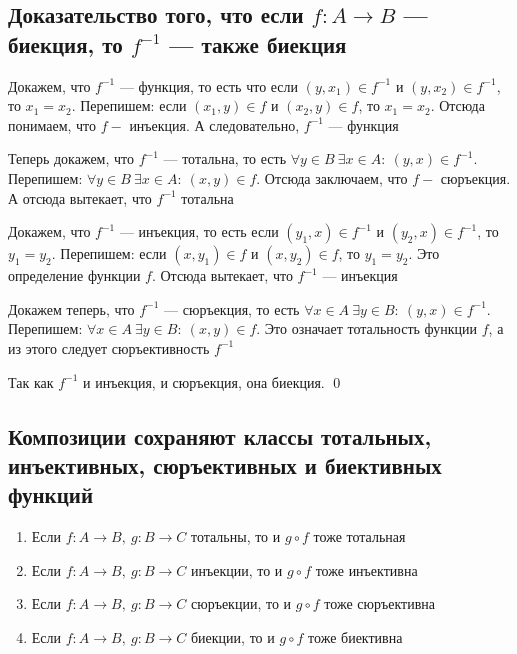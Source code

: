 \documentclass[a4paper]{article}
\begin{document}
\subsection{Доказательство того, что если $f: A\rightarrow B$ — биекция, то $f^{-1}$ — также биекция}
\label{sec:2.6}Докажем, что $f^{-1}$ — функция, то есть что если $(y, x_1)\in f^{-1}$ и $(y, x_2)\in f^{-1}$, то $x_1=x_2$. Перепишем: если $(x_1, y)\in f$ и $(x_2, y)\in f$, то $x_1=x_2$. Отсюда понимаем, что $f-$ инъекция. А следовательно, $f^{-1}$ — функция

Теперь докажем, что $f^{-1}$ — тотальна, то есть $\forall y\in B\ \exists x\in A:\ (y,x)\in f^{-1}$. Перепишем: $\forall y\in B\ \exists x\in A:\ (x,y)\in f$. Отсюда заключаем, что $f-$ сюръекция. А отсюда вытекает, что $f^{-1}$ тотальна

Докажем, что $f^{-1}$ — инъекция, то есть если $(y_1,x)\in f^{-1}$ и $(y_2,x)\in f^{-1}$, то $y_1=y_2$. Перепишем: если $(x,y_1)\in f$ и $(x,y_2)\in f$, то $y_1=y_2$. Это определение функции $f$. Отсюда вытекает, что $f^{-1}$ — инъекция

Докажем теперь, что $f^{-1}$ — сюръекция, то есть $\forall x\in A\ \exists y \in B:\ (y,x)\in f^{-1}$. Перепишем: $\forall x\in A\ \exists y\in B:\ (x,y)\in f$. Это означает тотальность функции $f$, а из этого следует сюръективность $f^{-1}$

Так как $f^{-1}$ и инъекция, и сюръекция, она биекция. \qed
\subsection{Композиции сохраняют классы тотальных, инъективных, сюръективных и биективных функций}
\label{sec:2.7}\theorem 
\begin{enumerate}
    \item Если $f: A\rightarrow B,\ g: B\rightarrow C$ тотальны, то и $g\circ f$ тоже тотальная 
    \item Если $f: A\rightarrow B,\ g: B\rightarrow C$ инъекции, то и $g\circ f$ тоже инъективна
    \item Если $f: A\rightarrow B,\ g: B\rightarrow C$ сюръекции, то и $g\circ f$ тоже сюръективна
    \item Если $f: A\rightarrow B,\ g: B\rightarrow C$ биекции, то и $g\circ f$ тоже биективна
\end{enumerate}
\end{document}
